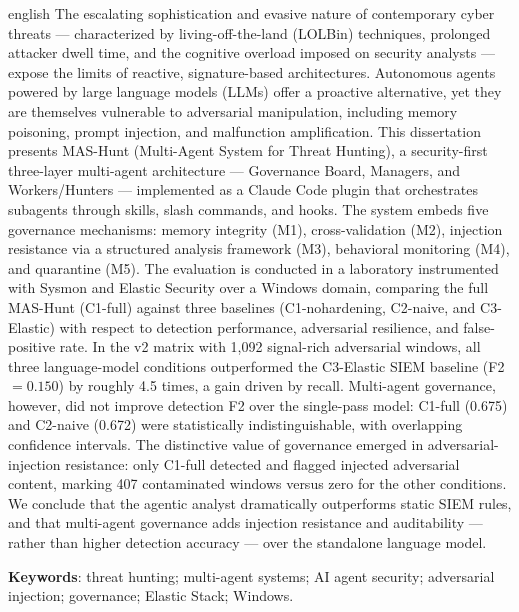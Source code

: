 \documentclass[
  12pt,
  a4paper,
  oneside,        %
  brazil
]{abntex2}
\begin{document}
\begin{resumo}[Abstract]
\begin{otherlanguage*}{english}
The escalating sophistication and evasive nature of contemporary cyber threats —
characterized by living-off-the-land (LOLBin) techniques, prolonged attacker
dwell time, and the cognitive overload imposed on security analysts — expose the
limits of reactive, signature-based architectures. Autonomous agents powered by
large language models (LLMs) offer a proactive alternative, yet they are
themselves vulnerable to adversarial manipulation, including memory poisoning,
prompt injection, and malfunction amplification. This dissertation presents
MAS-Hunt (Multi-Agent System for Threat Hunting), a security-first three-layer
multi-agent architecture — Governance Board, Managers, and Workers/Hunters —
implemented as a Claude Code plugin that orchestrates subagents through skills,
slash commands, and hooks. The system embeds five governance mechanisms: memory
integrity (M1), cross-validation (M2), injection resistance via a structured
analysis framework (M3), behavioral monitoring (M4), and quarantine (M5). The
evaluation is conducted in a laboratory instrumented with Sysmon and Elastic
Security over a Windows domain, comparing the full MAS-Hunt (C1-full) against
three baselines (C1-nohardening, C2-naive, and C3-Elastic) with respect to
detection performance, adversarial resilience, and false-positive rate. In the
v2 matrix with 1,092 signal-rich adversarial windows, all three language-model
conditions outperformed the C3-Elastic SIEM baseline (F2~$=0.150$) by roughly
4.5 times, a gain driven by recall. Multi-agent governance, however, did not
improve detection F2 over the single-pass model: C1-full (0.675) and C2-naive
(0.672) were statistically indistinguishable, with overlapping confidence
intervals. The distinctive value of governance emerged in adversarial-injection
resistance: only C1-full detected and flagged injected adversarial content,
marking 407 contaminated windows versus zero for the other conditions. We
conclude that the agentic analyst dramatically outperforms static SIEM rules,
and that multi-agent governance adds injection resistance and auditability ---
rather than higher detection accuracy --- over the standalone language model.

\noindent\textbf{Keywords}: threat hunting; multi-agent systems; AI agent
security; adversarial injection; governance; Elastic Stack; Windows.
\end{otherlanguage*}
\end{resumo}
\end{document}
